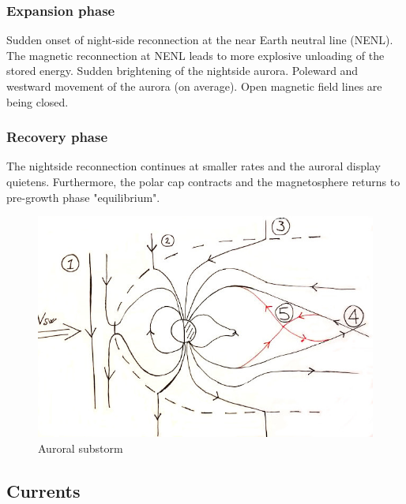 \documentclass[10pt,a4paper]{article}
\begin{document}
\subsubsection{Expansion phase}
Sudden onset of night-side reconnection at the near Earth neutral line (NENL). The magnetic reconnection at NENL leads to more explosive unloading of the stored energy. 
Sudden brightening of the nightside aurora. Poleward and westward movement of the aurora (on average). Open magnetic field lines are being closed. 
\subsubsection{Recovery phase}
The nightside reconnection continues at smaller rates and the auroral display quietens. Furthermore, the polar cap contracts and the magnetosphere returns to pre-growth phase "equilibrium". 
\begin{figure}[h]
\centering
\caption{Auroral substorm}
\label{aurora substorm}
\includegraphics[scale=0.5]{solvind2.jpg}
\end{figure}

\subsection{Currents \label{_CHAP_THEO_currents}}
\end{document}
